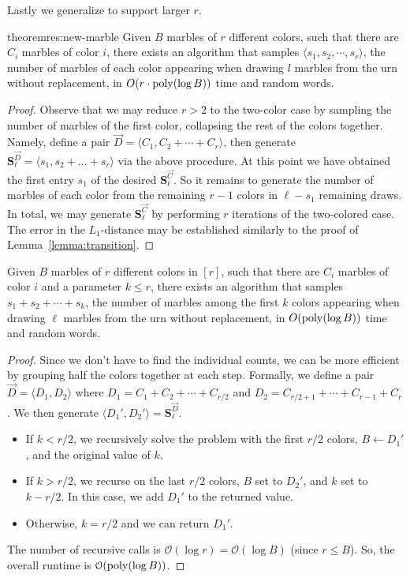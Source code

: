 Lastly we generalize to support larger $r$.
\begin{restatable}{theorem}{res:new-marble}
\label{thm:sampling_many_colors}
Given $B$ marbles of $r$ different colors, such that there are $C_i$ marbles of color $i$,
there exists an algorithm that samples $\langle s_1, s_2,\cdots, s_r \rangle$,
the number of marbles of each color appearing when drawing $l$ marbles from the urn without replacement,
in $O(r\cdot\mathrm{poly}(\log B))$ time and random words.
\end{restatable}
\begin{proof}
Observe that we may reduce $r>2$ to the two-color case by sampling the number of marbles of the first color,
collapsing the rest of the colors together.
Namely, define a pair $\vec D=\langle C_1, C_2+\cdots+C_r \rangle$,
then generate $\mathbf{S}^{\vec D}_{\ell}=\langle s_1, s_2+\ldots+s_r\rangle$ via the above procedure.
At this point we have obtained the first entry $s_1$ of the desired $\mathbf{S}^{\vec{C}}_{\ell}$.
So it remains to generate the number of marbles of each color from the remaining $r-1$ colors in $\ell-s_1$ remaining draws.
In total, we may generate $\mathbf{S}^{\vec{C}}_{\ell}$ by performing $r$ iterations of the two-colored case.
The error in the $L_1$-distance may be established similarly to the proof of Lemma~\ref{lemma:transition}.
\end{proof}
\begin{theorem}
\label{thm:sampling_many_colors_contiguous}
Given $B$ marbles of $r$ different colors in $[r]$, such that there are $C_i$ marbles of color $i$ and a parameter $k\le r$,
there exists an algorithm that samples $s_1 + s_2 +\cdots + s_k$,
the number of marbles among the first $k$ colors appearing when drawing $\ell$ marbles from the urn without replacement,
in $O(\mathrm{poly}(\log B))$ time and random words.
\end{theorem}
\begin{proof}
Since we don't have to find the individual counts, we can be more efficient by grouping half the colors together at each step.
Formally, we define a pair $\vec  D= \langle D_1,D_2 \rangle$ where $D_1=C_1 + C_2 +\cdots + C_{r/2}$ and $D_2=C_{r/2+1}+\cdots+C_{r-1}+C_r$.
We then generate $ \langle D_1', D_2'\rangle = \mathbf S^{\vec D}_\ell$.
\begin{itemize}
    \item If $k < r/2$, we recursively solve the problem with the first $r/2$ colors, $B\gets D_1'$, and the original value of $k$.
    \item If $k > r/2$, we recurse on the last $r/2$ colors, $B$ set to $D_2'$, and $k$ set to $k-r/2$.
    In this case, we add $D_1'$ to the returned value.
    \item Otherwise, $k=r/2$ and we can return $D_1'$.
\end{itemize}
The number of recursive calls is $\mathcal O(\log r) = \mathcal O(\log B)$ (since $r\le B$).
So, the overall runtime is $\mathcal O(\mathrm{poly}(\log B))$.
\end{proof}




